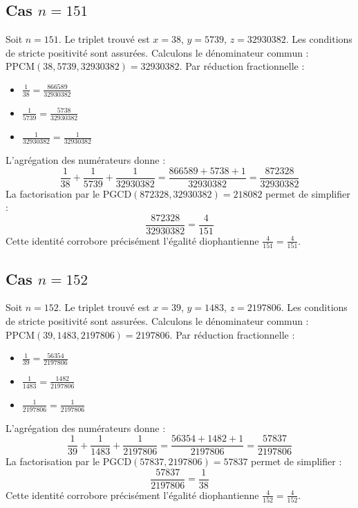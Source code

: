 \documentclass[11pt,a4paper]{article}
\begin{document}
\subsection{Cas $n = 151$}
Soit $n = 151$. Le triplet trouvé est $x = 38$, $y = 5739$, $z = 32930382$.
Les conditions de stricte positivité sont assurées.
Calculons le dénominateur commun : $\text{PPCM}(38, 5739, 32930382) = 32930382$.
Par réduction fractionnelle :
\begin{itemize}
    \item $\frac{1}{38} = \frac{866589}{32930382}$
    \item $\frac{1}{5739} = \frac{5738}{32930382}$
    \item $\frac{1}{32930382} = \frac{1}{32930382}$
\end{itemize}
L'agrégation des numérateurs donne :
$$ \frac{1}{38} + \frac{1}{5739} + \frac{1}{32930382} = \frac{866589 + 5738 + 1}{32930382} = \frac{872328}{32930382} $$
La factorisation par le $\text{PGCD}(872328, 32930382) = 218082$ permet de simplifier :
$$ \frac{872328}{32930382} = \frac{4}{151} $$
Cette identité corrobore précisément l'égalité diophantienne $\frac{4}{151} = \frac{4}{151}$.

\subsection{Cas $n = 152$}
Soit $n = 152$. Le triplet trouvé est $x = 39$, $y = 1483$, $z = 2197806$.
Les conditions de stricte positivité sont assurées.
Calculons le dénominateur commun : $\text{PPCM}(39, 1483, 2197806) = 2197806$.
Par réduction fractionnelle :
\begin{itemize}
    \item $\frac{1}{39} = \frac{56354}{2197806}$
    \item $\frac{1}{1483} = \frac{1482}{2197806}$
    \item $\frac{1}{2197806} = \frac{1}{2197806}$
\end{itemize}
L'agrégation des numérateurs donne :
$$ \frac{1}{39} + \frac{1}{1483} + \frac{1}{2197806} = \frac{56354 + 1482 + 1}{2197806} = \frac{57837}{2197806} $$
La factorisation par le $\text{PGCD}(57837, 2197806) = 57837$ permet de simplifier :
$$ \frac{57837}{2197806} = \frac{1}{38} $$
Cette identité corrobore précisément l'égalité diophantienne $\frac{4}{152} = \frac{4}{152}$.
\end{document}
